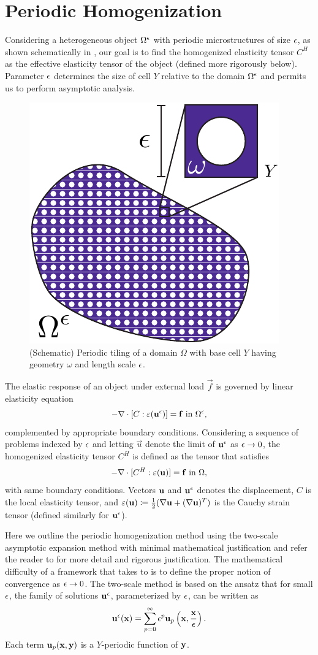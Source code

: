 \documentclass[twocolumn,10pt]{article}
\begin{document}
\section{Periodic Homogenization\label{sec:homogen}}
Considering a heterogeneous object $\Omega^\epsilon$ with periodic
microstructures of size $\epsilon$, as shown schematically in
, our goal is to find the homogenized elasticity
tensor $C^H$ as the effective elasticity tensor of the object (defined
more rigorously below). Parameter $\epsilon$ determines the size of cell $Y$
relative to the domain $\Omega^\epsilon$ and permits us to perform
asymptotic analysis.
\begin{figure}[!hbt]
    \centering
    \includegraphics[width=.28\textwidth]{Images/periodic.pdf}
    \caption{(Schematic) Periodic tiling of a domain $\Omega$ with
      base cell $Y$ having geometry $\omega$ and length scale $\epsilon$.}
    \label{fig:periodic}
\end{figure}

The elastic response of an object under external load $\vec{f}$ is
governed by linear elasticity equation
\begin{equation}
  \label{eqn:elastostatic}
  -\nabla \cdot [C : \varepsilon(\mathbf u^\epsilon)] = \mathbf f \text{ in }\Omega^\epsilon,
\end{equation}
complemented by appropriate boundary conditions. Considering a
sequence of problems indexed by $\epsilon$ and letting $\vec{u}$ denote the
limit of $\mathbf u^\epsilon$ as $\epsilon\to 0$, the homogenized elasticity tensor $C^H$
is defined as the tensor that satisfies
\begin{equation}
    \label{eqn:homogenElasto}
  -\nabla \cdot [C^H : \varepsilon(\mathbf u)] = \mathbf f \text{ in }\Omega,
\end{equation}
with same boundary conditions. Vectors $\mathbf u$ and $\mathbf u^\epsilon$ denotes the
displacement, $C$ is the local elasticity tensor, and $\varepsilon(\mathbf u)
\coloneqq \frac{1}{2}(\nabla \mathbf u + (\nabla \mathbf u)^T )$ is the Cauchy
strain tensor (defined similarly for $\mathbf u^\epsilon$).

Here we outline the periodic homogenization method using the two-scale
asymptotic expansion method with minimal mathematical justification
and refer the reader to \cite{allaire2002shape,
  allaire1992homogenization, defranceschi1993} for more detail and
rigorous justification. The mathematical difficulty of a framework
that takes  to  is to
define the proper notion of convergence as $\epsilon\to 0$. The two-scale
method is based on the ansatz that for small $\epsilon$, the family of
solutions $\mathbf u^\epsilon$, parameterized by $\epsilon$, can be written as
\begin{equation}
  \label{eqn:AsymSeries}
  \mathbf u^\epsilon(\mathbf x) = \sum_{p = 0}^{\infty} \epsilon^p \mathbf u_p\left(\mathbf x, \frac{\mathbf x}{\epsilon}\right).
\end{equation}
Each term $\mathbf u_p(\mathbf x,\mathbf y)$ is a $Y$-periodic function of $\mathbf y$.
\end{document}
